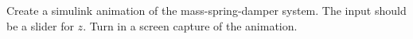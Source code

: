 Create a simulink animation of the mass-spring-damper system. The input should be a slider for $z$.  Turn in a screen capture of the animation.
